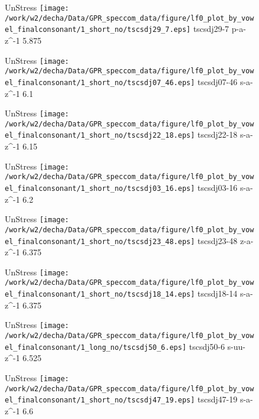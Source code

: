 \documentclass{article}
\begin{document}
\begin{figure}[t]
\begin{minipage}[b]{.24\textwidth}
UnStress
\centering
\texttt{[image: /work/w2/decha/Data/GPR\_speccom\_data/figure/lf0\_plot\_by\_vowel\_finalconsonant/1\_short\_no/tscsdj29\_7.eps]}
tscsdj29-7 p-a-z\textasciicircum-1 5.875
\end{minipage}
\begin{minipage}[b]{.24\textwidth}
UnStress
\centering
\texttt{[image: /work/w2/decha/Data/GPR\_speccom\_data/figure/lf0\_plot\_by\_vowel\_finalconsonant/1\_short\_no/tscsdj07\_46.eps]}
tscsdj07-46 s-a-z\textasciicircum-1 6.1
\end{minipage}
\begin{minipage}[b]{.24\textwidth}
UnStress
\centering
\texttt{[image: /work/w2/decha/Data/GPR\_speccom\_data/figure/lf0\_plot\_by\_vowel\_finalconsonant/1\_short\_no/tscsdj22\_18.eps]}
tscsdj22-18 s-a-z\textasciicircum-1 6.15
\end{minipage}
\begin{minipage}[b]{.24\textwidth}
UnStress
\centering
\texttt{[image: /work/w2/decha/Data/GPR\_speccom\_data/figure/lf0\_plot\_by\_vowel\_finalconsonant/1\_short\_no/tscsdj03\_16.eps]}
tscsdj03-16 s-a-z\textasciicircum-1 6.2
\end{minipage}
\end{figure}
\clearpage
\begin{figure}[t]
\begin{minipage}[b]{.24\textwidth}
UnStress
\centering
\texttt{[image: /work/w2/decha/Data/GPR\_speccom\_data/figure/lf0\_plot\_by\_vowel\_finalconsonant/1\_short\_no/tscsdj23\_48.eps]}
tscsdj23-48 z-a-z\textasciicircum-1 6.375
\end{minipage}
\begin{minipage}[b]{.24\textwidth}
UnStress
\centering
\texttt{[image: /work/w2/decha/Data/GPR\_speccom\_data/figure/lf0\_plot\_by\_vowel\_finalconsonant/1\_short\_no/tscsdj18\_14.eps]}
tscsdj18-14 s-a-z\textasciicircum-1 6.375
\end{minipage}
\begin{minipage}[b]{.24\textwidth}
UnStress
\centering
\texttt{[image: /work/w2/decha/Data/GPR\_speccom\_data/figure/lf0\_plot\_by\_vowel\_finalconsonant/1\_long\_no/tscsdj50\_6.eps]}
tscsdj50-6 s-uu-z\textasciicircum-1 6.525
\end{minipage}
\begin{minipage}[b]{.24\textwidth}
UnStress
\centering
\texttt{[image: /work/w2/decha/Data/GPR\_speccom\_data/figure/lf0\_plot\_by\_vowel\_finalconsonant/1\_short\_no/tscsdj47\_19.eps]}
tscsdj47-19 s-a-z\textasciicircum-1 6.6
\end{minipage}
\end{figure}
\end{document}
